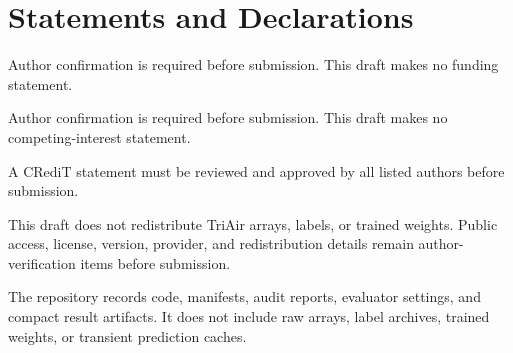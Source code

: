 \section*{Statements and Declarations}
Author confirmation is required before submission. This draft makes no funding statement.

Author confirmation is required before submission. This draft makes no competing-interest statement.

A CRediT statement must be reviewed and approved by all listed authors before submission.

This draft does not redistribute TriAir arrays, labels, or trained weights. Public access, license, version, provider, and redistribution details remain author-verification items before submission.

The repository records code, manifests, audit reports, evaluator settings, and compact result artifacts. It does not include raw arrays, label archives, trained weights, or transient prediction caches.

